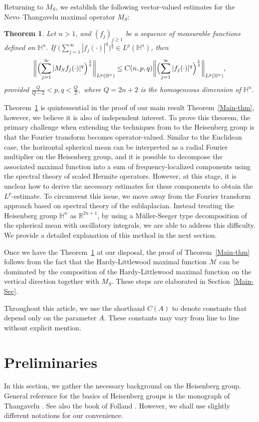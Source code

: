 \documentclass[11pt]{amsart}
\newcommand {\R}{\mathbb R}
\newcommand{\Ha}{\mathbb{H}^n}
\newtheorem{theorem}{Theorem}[section]
\theoremstyle{definition}
\numberwithin{equation}{section}
\begin{document}
 Returning to $M_S$, we establish the following vector-valued estimates for the Nevo–Thangavelu maximal operator $M_S$:

\begin{theorem}
\label{Sph-Main-Heisenber}
Let $n>1$, and $(f_j)_{j\geq1}$ be a sequence of measurable functions defined on $\Ha$. If $\bigl(\sum_{j=1}^{\infty}|f_j(\cdot)|^q\bigr)^\frac{1}{q} \in L^p(\Ha)$, then 
\[
\biggl\|\Bigl(\sum_{j=1}^{\infty}|M_{S}f_j(\cdot)|^q\Bigr)^\frac{1}{q}\biggr\|_{L^p(\Ha)}\leq C(n, p, q)\biggl\|\Bigl(\sum_{j=1}^{\infty}|f_j(\cdot)|^q\Bigr)^\frac{1}{q}\biggr\|_{L^p(\Ha)},
\]
provided $\frac{Q}{Q-2}<p, q<\frac{Q}{2},$ where $Q=2n+2$ is the homogeneous dimension of $\Ha.$
\end{theorem}
Theorem~\ref{Sph-Main-Heisenber} is quintessential in the proof of our main result Theorem~\ref{Main-thm}, however, we believe it is also of independent interest. To prove this theorem, the primary challenge when extending the techniques from \cite{DK} to the Heisenberg group is that the Fourier transform becomes operator-valued. Similar to the Euclidean case, the horizontal spherical mean can be interpreted as a radial Fourier multiplier on the Heisenberg group, and it is possible to decompose the associated maximal function into a sum of frequency-localized components using the spectral theory of scaled Hermite operators. However, at this stage, it is unclear how to derive the necessary estimates for these components to obtain the $L^p$-estimate. To circumvent this issue, we move away from the Fourier transform approach based on spectral theory of the sublaplacian. Instead treating the Heisenberg group $\Ha$ as $\R^{2n+1}$, by using a M\"uller-Seeger type decomposition of the spherical mean with oscillatory integrals, we are able to address this difficulty. We provide a detailed explanation of this method in the next section.

Once we have the Theorem~\ref{Sph-Main-Heisenber} at our disposal, the proof of Theorem~\ref{Main-thm} follows from the fact that the Hardy-Littlewood maximal function $\mathcal{M}$ can be dominated by the composition of the Hardy-Littlewood maximal function on the vertical direction together with $M_{S}.$ These steps are elaborated in Section~\ref{Main-Sec}.

Throughout this article, we use the shorthand $C(A)$ to denote constants that depend only on the parameter $A$. These constants may vary from line to line without explicit mention.


\section{Preliminaries}
\label{Prelim}
In this section, we gather the necessary background on the Heisenberg group. General reference for the basics of Heisenberg groups is the monograph of Thangavelu \cite{TH}. See also the book of Folland \cite{Folland}.  However, we shall use slightly different notations for our convenience. 
\end{document}
